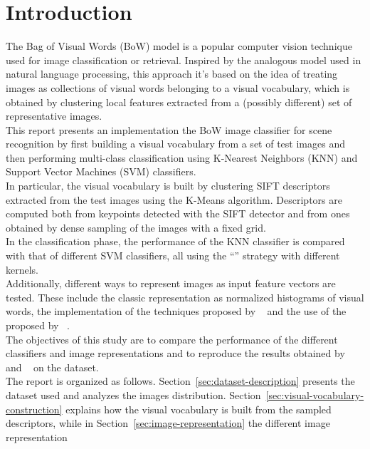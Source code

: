 \documentclass[../main.tex]{subfiles}
\begin{document}
\section{Introduction}

The Bag of Visual Words (BoW) model is a popular computer vision technique used
for image classification or retrieval. Inspired by the analogous model
used in natural language processing, this approach it's based on the idea of
treating images as collections of
visual words belonging to a visual vocabulary, which is obtained by clustering
local features extracted from a (possibly different) set of representative images.\\
This report presents an implementation the BoW image classifier for scene recognition by first building a visual vocabulary from a set of test images and then performing multi-class classification using K-Nearest Neighbors (KNN) and Support Vector Machines (SVM) classifiers.\\
In particular, the visual vocabulary is built by clustering SIFT descriptors
extracted from the test images using the K-Means algorithm. 
Descriptors are computed both from keypoints detected with the SIFT detector and
from ones obtained by dense sampling of the images with a fixed grid.\\
In the classification phase, the performance of the KNN classifier is compared
with that of different SVM classifiers, all using the ``''
strategy with different kernels.\\
Additionally, different ways to represent images as input feature vectors are
tested. These include the classic representation as normalized histograms of
visual words, the implementation of the  techniques
proposed by ~\cite{gemert} and the use of the
 proposed by ~\cite{lazebnik}.\\
The objectives of this study are to compare the performance of the different
classifiers and image representations and to reproduce the results obtained by
~\cite{gemert} and ~\cite{lazebnik}
on the  dataset.\\
The report is organized as follows. 
Section~\ref{sec:dataset-description} presents the dataset used and analyzes the
images distribution.
Section~\ref{sec:visual-vocabulary-construction} explains how the visual
vocabulary is built from the sampled descriptors, while in
Section~\ref{sec:image-representation} the different image representation
\end{document}
